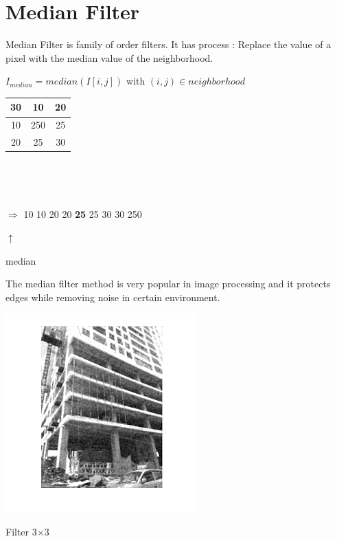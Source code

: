 \section{Median Filter}
Median Filter is family of order filters. It has process : Replace the value of a pixel with the median value of the neighborhood.

$I_{median} = median(I[i,j])$  with $(i,j)\in neighborhood$
\vspace{2cm}
\begin{center}
	

\begin{tabular}{|c|c|c|}  
	\hline 
	30 & 10 & 20 \\ 
	\hline                    
	10 & 250 & 25 \\ 
	\hline 
	20 & 25 & 30 \\ 
	\hline 
\end{tabular} 
\end{center}
\

\



$\Rightarrow$ 10 10 20 20 \textbf{25} 25 30 30 250 

\hspace{26mm}$\uparrow$

\hspace{20mm} median
\vspace{2cm}

The median filter method is very popular in image processing and it protects edges while removing noise in certain environment.

\newpage
\vspace{2cm}

\begin{center}
	\includegraphics{medianc3.png}
	
	Filter 3$\times$3
\end{center}

